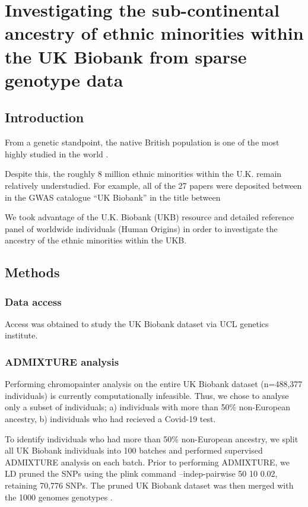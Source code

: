\chapter{Investigating the sub-continental ancestry of ethnic minorities within the UK Biobank from sparse genotype data}
\label{chapterlabel3}

\section{Introduction}

From a genetic standpoint, the native British population is one of the most highly studied in the world \cite{Leslie2015, }.


Despite this, the roughly 8 million ethnic minorities within the U.K. remain relatively understudied. For example, all of the 27 papers were deposited between  in the GWAS catalogue “UK Biobank” in the title between 



We took advantage of the U.K. Biobank (UKB) resource and detailed reference panel of worldwide individuals (Human Origins) in order to investigate the ancestry of the ethnic minorities within the UKB. 

\section{Methods}

\subsection{Data access}

Access was obtained to study the UK Biobank dataset via UCL genetics institute. 

\subsection{ADMIXTURE analysis}

Performing chromopainter analysis on the entire UK Biobank dataset (n=488,377 individuals) is currently computationally infeasible. Thus, we chose to analyse only a subset of individuals; a) individuals with more than 50\% non-European ancestry, b) individuals who had recieved a Covid-19 test.

To identify individuals who had more than 50\% non-European ancestry, we split all UK Biobank individuals into 100 batches and performed supervised ADMIXTURE \cite{alexander2009fast} analysis on each batch. Prior to performing ADMIXTURE, we LD pruned the SNPs using the plink \cite{purcell2007plink} command --indep-pairwise 50 10 0.02, retaining 70,776 SNPs. The pruned UK Biobank dataset was then merged with the 1000 genomes genotypes \cite{10002010map}. 

